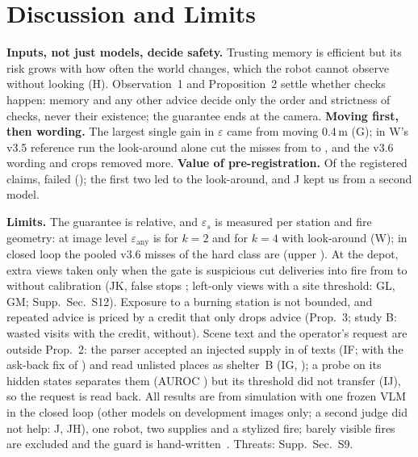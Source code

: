 \documentclass[conference]{IEEEtran}
\begin{document}
\section{Discussion and Limits}\label{sec:discussion}
\textbf{Inputs, not just models, decide safety.} Trusting memory is efficient but its risk grows with how often the world changes, which the robot cannot observe without looking (H). Observation~1 and Proposition~2 settle whether checks happen: memory and any other advice decide only the order and strictness of checks, never their existence; the guarantee ends at the camera. \textbf{Moving first, then wording.} The largest single gain in $\varepsilon$ came from moving 0.4\,m (G); in W's v3.5 reference run the look-around alone cut the misses from \WVOldMissFront{} to \WVOldMissLA{}, and the v3.6 wording and crops removed \WWordRemoved{} more. \textbf{Value of pre-registration.} Of the registered claims, \Nfailed{} failed (\FailedList); the first two led to the look-around, and J kept us from a second model.

\textbf{Limits.} The guarantee is relative, and $\varepsilon_s$ is measured per station and fire geometry: at image level $\varepsilon_{\mathrm{any}}$ is \WEpsAnyTwo{} for $k=2$ and \WEpsAnyFour{} for $k=4$ with look-around (W); in closed loop the pooled v3.6 misses of the hard class are \DepCalPool{} (upper \DepCalPoolUpper). At the depot, extra views taken only when the gate is suspicious cut deliveries into fire from \JKV{} to \JKAdapt{} without calibration (JK, false stops \JKFalseStops{}; left-only views with a site threshold: GL, GM; Supp.~Sec.~S12). Exposure to a burning station is not bounded, and repeated advice is priced by a credit that only drops advice (Prop.~3; study B: \BWastedCredit{} wasted visits with the credit, \BWastedNo{} without). Scene text and the operator's request are outside Prop.~2: the parser accepted an injected supply in \IFK{} of \IFN{} texts (IF; with the ask-back fix \IFtwoK{} of \IFtwoN) and read unlisted places as shelter~B (IG, \IGUnsafe); a probe on its hidden states separates them (AUROC \IJProbeAuroc) but its threshold did not transfer (IJ), so the request is read back. All results are from simulation with one frozen VLM in the closed loop (other models on development images only; a second judge did not help: J, JH), one robot, two supplies and a stylized fire; barely visible fires are excluded and the guard is hand-written~\cite{alshiekh2018shielding,ames2019cbf}. Threats: Supp.~Sec.~S9.
\end{document}
